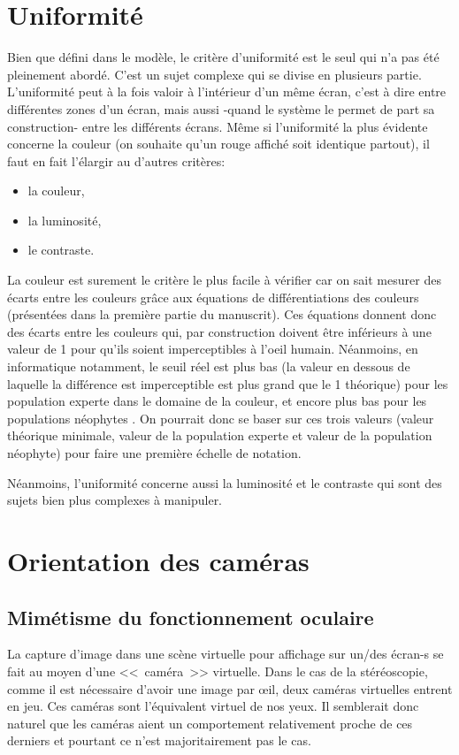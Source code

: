 	\section{Uniformité}
	\par Bien que défini dans le modèle, le critère d'uniformité est le seul qui n'a pas été pleinement abordé. C'est un sujet complexe qui se divise en plusieurs partie. L'uniformité peut à la fois valoir à l'intérieur d'un même écran, c'est à dire entre différentes zones d'un écran, mais aussi -quand le système le permet de part sa construction- entre les différents écrans. Même si l'uniformité la plus évidente concerne la couleur (on souhaite qu'un rouge affiché soit identique partout), il faut en fait l'élargir au d'autres critères:
	\begin{itemize}
		\item la couleur,
		\item la luminosité,
		\item le contraste.
	\end{itemize}
	
	\par La couleur est surement le critère le plus facile à vérifier car on sait mesurer des écarts entre les couleurs grâce aux équations de différentiations des couleurs (présentées dans la première partie du manuscrit). Ces équations donnent donc des écarts entre les couleurs qui, par construction doivent être inférieurs à une valeur de 1 pour qu'ils soient imperceptibles à l'oeil humain. Néanmoins, en informatique notamment, le seuil réel est plus bas (la valeur en dessous de laquelle la différence est imperceptible est plus grand que le 1 théorique) pour les population experte dans le domaine de la couleur, et encore plus bas pour les populations néophytes \citep{vidal_color-difference_2016}. On pourrait donc se baser sur ces trois valeurs (valeur théorique minimale, valeur de la population experte et valeur de la population néophyte) pour faire une première échelle de notation.
	
	\par Néanmoins, l'uniformité concerne aussi la luminosité et le contraste qui sont des sujets bien plus complexes à manipuler.
	
	\section{Orientation des caméras}	
	\subsection{Mimétisme du fonctionnement oculaire}	
	\par La capture d'image dans une scène virtuelle pour affichage sur un/des écran-s se fait au moyen d'une <<~caméra~>> virtuelle. Dans le cas de la stéréoscopie, comme il est nécessaire d'avoir une image par œil, deux caméras virtuelles entrent en jeu. Ces caméras sont l'équivalent virtuel de nos yeux. Il semblerait donc naturel que les caméras aient un comportement relativement proche de ces derniers et pourtant ce n'est majoritairement pas le cas.
	
